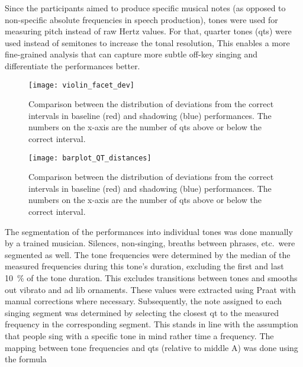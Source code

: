 Since the participants aimed to produce specific musical notes (as opposed to non-specific absolute frequencies in speech production), tones were used for measuring pitch instead of raw Hertz values.
For that, quarter tones (\acfp{qt}) were used instead of semitones to increase the tonal resolution, 
This enables a more fine-grained analysis that can capture more subtle off-key singing and differentiate the performances better.
%
\begin{figure}[t!]
	\centering
	\texttt{[image: violin\_facet\_dev]}
	\caption[Summary of within-participant interval deviation distribution]
		{Comparison between the distribution of deviations from the correct intervals in baseline (red) and shadowing (blue) performances.
		The numbers on the x-axis are the number of \acp{qt} above or below the correct interval.}
	\label{fig:violin_facet_dev}
\end{figure}
%
\begin{figure}[t!]
	\centering
	\texttt{[image: barplot\_QT\_distances]}
	\caption[Distribution of interval deviations]
	{Comparison between the distribution of deviations from the correct intervals in baseline (red) and shadowing (blue) performances.
		The numbers on the x-axis are the number of \acp{qt} above or below the correct interval.}
	\label{fig:barplot_QT_distances}
\end{figure}
%
The segmentation of the performances into individual tones was done manually by a trained musician.
Silences, non-singing, breaths between phrases, etc.\ were segmented as well.
The tone frequencies were determined by the median of the measured frequencies during this tone's duration, excluding the first and last \SI{10}{\percent} of the tone duration.
This excludes transitions between tones and smooths out vibrato and ad lib ornaments.
These values were extracted using Praat \citep{Boersma2018praat} with manual corrections where necessary.
Subsequently, the note assigned to each singing segment was determined by selecting the closest \ac{qt} to the measured frequency in the corresponding segment.
This stands in line with the assumption that people sing with a specific tone in mind rather time a frequency.
The mapping between tone frequencies and \acp{qt} (relative to middle A) was done using the formula
